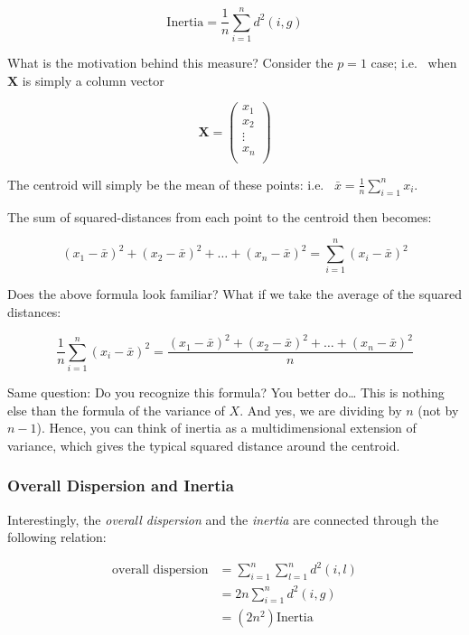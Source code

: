 \documentclass[]{book}
\begin{document}
\[
\text{Inertia} = \frac{1}{n} \sum_{i=1}^{n} d^2(i,g)
\]

What is the motivation behind this measure? Consider the \(p = 1\) case; i.e.~
when \(\mathbf{X}\) is simply a column vector

\[
\mathbf{X} = \begin{pmatrix} x_1 \\ x_2 \\ \vdots \\ x_n \\ \end{pmatrix}
\]

The centroid will simply be the mean of these points: i.e.~
\(\bar{x} = \frac{1}{n} \sum_{i=1}^{n} x_i\).

The sum of squared-distances from each point to the centroid then becomes:

\[
(x_1 - \bar{x})^2 + (x_2 - \bar{x})^2 + \dots + (x_n - \bar{x})^2 = \sum_{i=1}^{n} (x_i - \bar{x})^2
\]

Does the above formula look familiar? What if we take the average of the squared distances:

\[
\frac{1}{n} \sum_{i=1}^{n} (x_i - \bar{x})^2 = \frac{(x_1 - \bar{x})^2 + (x_2 - \bar{x})^2 + \dots + (x_n - \bar{x})^2}{n}
\]

Same question: Do you recognize this formula? You better do\ldots{}
This is nothing else than the
formula of the variance of \(X\). And yes, we are dividing by \(n\) (not by \(n-1\)).
Hence, you can think of inertia as a multidimensional extension of variance,
which gives the typical squared distance around the centroid.

\hypertarget{overall-dispersion-and-inertia}{%
\subsubsection*{Overall Dispersion and Inertia}\label{overall-dispersion-and-inertia}}

Interestingly, the \emph{overall dispersion} and the \emph{inertia} are connected through
the following relation:

\begin{align*}
\text{overall dispersion} &= \sum_{i=1}^{n} \sum_{l=1}^{n} d^2(i,l) \\
&= 2n \sum_{i=1}^{n} d^2(i,g) \\
&= (2n^2) \text{Inertia}
\end{align*}
\end{document}
